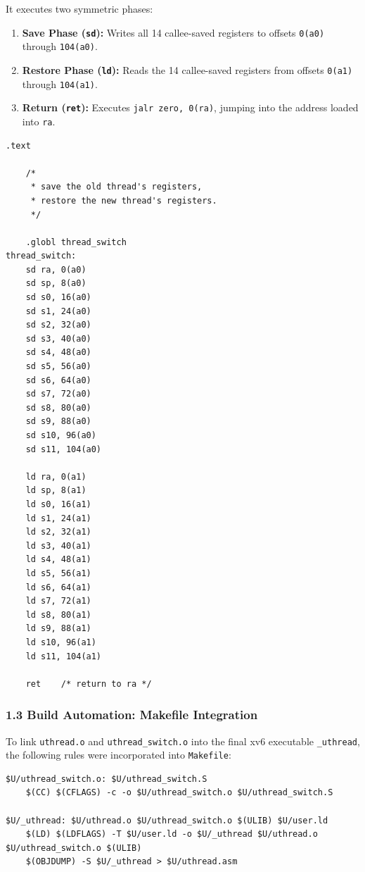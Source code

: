 \documentclass{labreport}
\begin{document}
It executes two symmetric phases:
\begin{enumerate}[noitemsep]
    \item \textbf{Save Phase (\texttt{sd}):} Writes all 14 callee-saved registers to offsets \texttt{0(a0)} through \texttt{104(a0)}.
    \item \textbf{Restore Phase (\texttt{ld}):} Reads the 14 callee-saved registers from offsets \texttt{0(a1)} through \texttt{104(a1)}.
    \item \textbf{Return (\texttt{ret}):} Executes \texttt{jalr zero, 0(ra)}, jumping into the address loaded into \texttt{ra}.
\end{enumerate}

\begin{lstlisting}[style=asm]
	.text

	/*
	 * save the old thread's registers,
	 * restore the new thread's registers.
	 */

	.globl thread_switch
thread_switch:
	sd ra, 0(a0)
	sd sp, 8(a0)
	sd s0, 16(a0)
	sd s1, 24(a0)
	sd s2, 32(a0)
	sd s3, 40(a0)
	sd s4, 48(a0)
	sd s5, 56(a0)
	sd s6, 64(a0)
	sd s7, 72(a0)
	sd s8, 80(a0)
	sd s9, 88(a0)
	sd s10, 96(a0)
	sd s11, 104(a0)

	ld ra, 0(a1)
	ld sp, 8(a1)
	ld s0, 16(a1)
	ld s1, 24(a1)
	ld s2, 32(a1)
	ld s3, 40(a1)
	ld s4, 48(a1)
	ld s5, 56(a1)
	ld s6, 64(a1)
	ld s7, 72(a1)
	ld s8, 80(a1)
	ld s9, 88(a1)
	ld s10, 96(a1)
	ld s11, 104(a1)

	ret    /* return to ra */
\end{lstlisting}

\subsubsection{1.3 Build Automation: Makefile Integration}
To link \texttt{uthread.o} and \texttt{uthread\_switch.o} into the final xv6 executable \texttt{\_uthread}, the following rules were incorporated into \texttt{Makefile}:

\begin{lstlisting}[style=bash]
$U/uthread_switch.o: $U/uthread_switch.S
	$(CC) $(CFLAGS) -c -o $U/uthread_switch.o $U/uthread_switch.S

$U/_uthread: $U/uthread.o $U/uthread_switch.o $(ULIB) $U/user.ld
	$(LD) $(LDFLAGS) -T $U/user.ld -o $U/_uthread $U/uthread.o $U/uthread_switch.o $(ULIB)
	$(OBJDUMP) -S $U/_uthread > $U/uthread.asm
\end{lstlisting}
\end{document}
